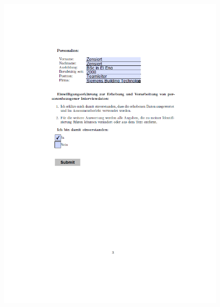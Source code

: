 \begin{figure}[ht]
 	\centering
 	\includegraphics[width=1.3\textwidth]{images/Imper3.png}
 	\label{fig:fragimp3}
\end{figure}
 


